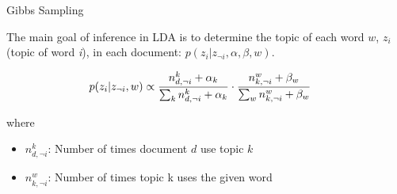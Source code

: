 \documentclass[
  ignorenonframetext,
]{beamer}
\begin{document}
\begin{frame}{Gibbs Sampling}
\protect\hypertarget{gibbs-sampling}{}

The main goal of inference in LDA is to determine the topic of each word
\(w\), \(z_{i}\) (topic of word \emph{i}), in each document:
\(p(z_{i}|z_{\neg i}, \alpha, \beta, w)\).

\begin{equation}
\begin{aligned}
p(z_{i}|z_{\neg i}, w) & \propto {n_{d,\neg i}^{k} + \alpha_{k} \over 
  \sum_{k} n_{d,\neg i}^{k} + \alpha_{k}} \cdot {n_{k,\neg i}^{w} + \beta_{w} \over 
  \sum_{w} n_{k,\neg i}^{w} + \beta_{w}}
\end{aligned}
\end{equation}

where

\begin{itemize}
\item
  \(n_{d,\neg i}^{k}\): Number of times document \(d\) use topic \(k\)
\item
  \(n_{k,\neg i}^{w}\): Number of times topic k uses the given word
\end{itemize}

\end{frame}
\end{document}
